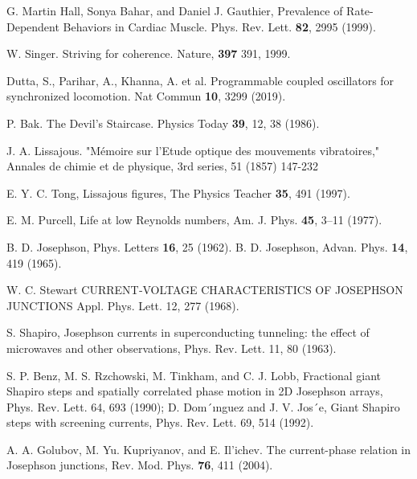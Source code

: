 \documentclass[twocolumn,preprintnumbers,amsmath,amssymb,aps,prx]{revtex4}
\begin{document}
\begin{thebibliography}{99}
   G. Martin Hall, Sonya Bahar, and Daniel J. Gauthier, Prevalence of Rate-Dependent Behaviors in Cardiac Muscle. Phys. Rev. Lett. {\bf 82}, 2995 (1999).

   W. Singer. Striving for coherence. Nature, {\bf 397} 391, 1999.

     Dutta, S., Parihar, A., Khanna, A. et al. Programmable coupled oscillators for synchronized locomotion. Nat Commun {\bf 10}, 3299 (2019).
    
     P. Bak. The Devil's Staircase. Physics Today {\bf 39}, 12, 38 (1986).

     J. A. Lissajous.  "Mémoire sur l'Etude optique des mouvements vibratoires,"  Annales de chimie et de physique, 3rd series, 51 (1857) 147-232

     E. Y. C. Tong, Lissajous figures, The Physics Teacher {\bf 35}, 491 (1997).

     E. M. Purcell, Life at low Reynolds numbers, Am. J. Phys. {\bf 45}, 3–11 (1977).


     B. D. Josephson, Phys. Letters {\bf 16}, 25 (1962). 
     B. D. Josephson, Advan. Phys. {\bf 14}, 419 (1965).

      W. C. Stewart CURRENT‐VOLTAGE CHARACTERISTICS OF JOSEPHSON JUNCTIONS Appl. Phys. Lett. 12, 277 (1968).
      
     S. Shapiro, Josephson currents in superconducting tunneling: the effect of microwaves and other observations, Phys. Rev. Lett. 11, 80 (1963).

      S. P. Benz, M. S. Rzchowski, M. Tinkham, and C. J. Lobb, Fractional giant Shapiro steps and spatially correlated phase motion in 2D Josephson arrays, Phys. Rev. Lett. 64, 693 (1990); D. Dom´ınguez and J. V. Jos´e, Giant Shapiro steps with screening currents, Phys. Rev. Lett. 69,
514 (1992).

     A. A. Golubov, M. Yu. Kupriyanov, and E. Il’ichev. The current-phase relation in Josephson junctions, Rev. Mod. Phys. {\bf 76}, 411 (2004).


\end{thebibliography}
\end{document}
